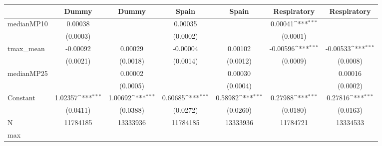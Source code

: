 {
\def\sym#1{\ifmmode^{#1}\else\(^{#1}\)\fi}
\begin{tabular}{l*{6}{c}}
\toprule
            &\multicolumn{1}{c}{Dummy}&\multicolumn{1}{c}{Dummy}&\multicolumn{1}{c}{Spain}&\multicolumn{1}{c}{Spain}&\multicolumn{1}{c}{Respiratory}&\multicolumn{1}{c}{Respiratory}\\
\midrule
medianMP10  &     0.00038         &                     &     0.00035         &                     &     0.00041\sym{***}&                     \\
            &    (0.0003)         &                     &    (0.0002)         &                     &    (0.0001)         &                     \\
tmax\_mean   &    -0.00092         &     0.00029         &    -0.00004         &     0.00102         &    -0.00596\sym{***}&    -0.00533\sym{***}\\
            &    (0.0021)         &    (0.0018)         &    (0.0014)         &    (0.0012)         &    (0.0009)         &    (0.0008)         \\
medianMP25  &                     &     0.00002         &                     &     0.00030         &                     &     0.00016         \\
            &                     &    (0.0005)         &                     &    (0.0004)         &                     &    (0.0002)         \\
Constant    &     1.02357\sym{***}&     1.00692\sym{***}&     0.60685\sym{***}&     0.58982\sym{***}&     0.27988\sym{***}&     0.27816\sym{***}\\
            &    (0.0411)         &    (0.0388)         &    (0.0272)         &    (0.0260)         &    (0.0180)         &    (0.0163)         \\
\midrule
N           &    11784185         &    13333936         &    11784185         &    13333936         &    11784721         &    13334533         \\
max         &                     &                     &                     &                     &                     &                     \\
\bottomrule
\end{tabular}
}
